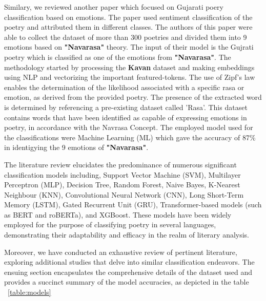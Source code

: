 \documentclass[conference]{IEEEtran}
\begin{document}
\par
Similary, we reviewed another paper \cite{b5} which focused on Gujarati poery classification based on emotions. The paper used sentiment classification of the poetry and attributed them in different classes. The authors of this paper were able to collect the dataset of more than 300 poetries and divided them into 9 emotions based on \textbf{"Navarasa"} theory. The input of their model is the Gujrati poetry which is classified as one of the emotions from \textbf{"Navarasa"}. The methodology started by processing the \textbf{Kavan} dataset and making embeddings using NLP and vectorizing the important featured-tokens. The use of Zipf's law enables the determination of the likelihood associated with a specific rasa or emotion, as derived from the provided poetry. The presence of the extracted word is determined by referencing a pre-existing dataset called 'Rasa'. This dataset contains words that have been identified as capable of expressing emotions in poetry, in accordance with the Navrasa Concept. The employed model used for the classifications were Machine Learning (ML) which gave the accuracy of 87\% in identigying the 9 emotions of \textbf{"Navarasa"}. 


\par The literature review elucidates the predominance of numerous significant classification models including,  Support Vector Machine (SVM), Multilayer Perceptron (MLP), Decision Tree, Random Forest, Naive Bayes, K-Nearest Neighbour (KNN), Convolutional Neural Network (CNN), Long Short-Term Memory (LSTM), Gated Recurrent Unit (GRU), Transformer-based models (such as BERT and roBERTa), and XGBoost. These models have been widely employed for the purpose of classifying poetry in several languages, demonstrating their adaptability and efficacy in the realm of literary analysis.
\par
Moreover, we have conducted an exhaustive review of pertinent literature, exploring additional studies that delve into similar classification endeavors. The ensuing section encapsulates the comprehensive details of the dataset used and provides a succinct summary of the model accuracies, as depicted in the table ~\ref{table:models}
\end{document}
